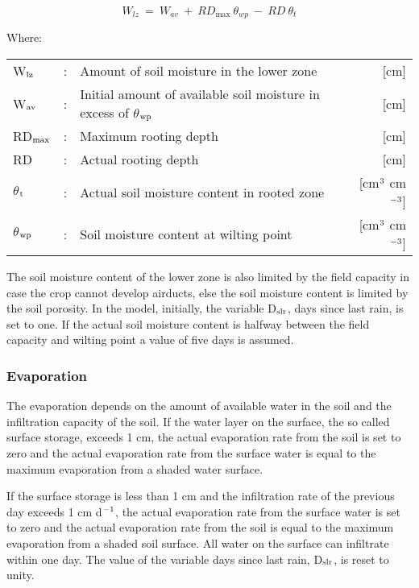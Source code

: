 \begin{equation}
W_{lz} ~ =~ W _{av} ~+~ RD_{\max } ~\theta_{wp} ~-~RD~\theta_{t} 
\end{equation}

Where:\\[5pt]
\begin{tabularx}{\textwidth}{llXr}
 W$_{{\rm lz}}$ &:& Amount of soil moisture in the lower zone & [cm]\\
 W$_{{\rm av}}$ &:& Initial amount of available soil moisture 
    in excess of $\theta$$_{{\rm wp}}$ & [cm]\\
 RD$_{{\rm max}}$ &:& Maximum rooting depth & [cm]\\
 RD &:& Actual rooting depth & [cm]\\
 $\theta$$_{{\rm t}}$ &:& Actual soil moisture content in rooted zone  & [cm$^{{\rm 3}}$ cm$^{{\rm -3}}$]\\
 $\theta$$_{{\rm wp}}$ &:& Soil moisture content at wilting point  & [cm$^{{\rm 3}}$ cm$^{{\rm -3}}$]\\
\end{tabularx}

The soil moisture content of the lower zone is also limited by the field capacity in case
the crop cannot develop airducts, else the soil moisture content is limited by the soil
porosity. In the model, initially, the variable D$_{{\rm slr}}$, days since last rain, is set to one. If the
actual soil moisture content is halfway between the field capacity and wilting point a
value of five days is assumed. 

\subsubsection{Evaporation}
The evaporation depends on the amount of available water in the soil and the infiltration
capacity of the soil. If the water layer on the surface, the so called surface storage, 
exceeds 1 cm, the actual evaporation rate from the soil is set to zero and the actual
evaporation rate from the surface water is equal to the maximum evaporation from a
shaded water surface.

If the surface storage is less than 1 cm and the infiltration rate of the previous day
exceeds 1 cm d$^{{\rm -1}}$, the actual evaporation rate from the surface water is set to zero and the
actual evaporation rate from the soil is equal to the maximum evaporation from a shaded
soil surface. All water on the surface can infiltrate within one day. The value of the
variable days since last rain, D$_{{\rm slr}}$, is reset to unity.

